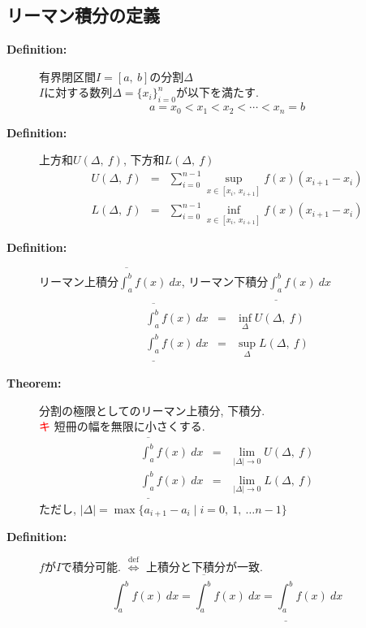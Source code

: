 \documentclass[dvipdfmx]{jsarticle}
\newcommand{\point}{\textcircled{\textcolor{red}{\scriptsize キ}} }
\newcommand{\defEq}{\overset{\mathrm{def}}{\Leftrightarrow}}
\begin{document}
    \subsection{リーマン積分の定義}
    \begin{description}
        \item[\bf{Definition:}] 有界閉区間$I = [a,\ b]$の分割$\Delta$ \\
            $I$に対する数列$\Delta = \{ x_i \}_{i=0}^n$が以下を満たす.
                $$ a = x_0 < x_1 < x_2 < \cdots < x_n = b $$
    
        \item[\bf{Definition:}] 上方和$U(\Delta,\ f)$, 下方和$L(\Delta,\ f)$
            \begin{eqnarray*} 
                U(\Delta,\ f) &=& \sum_{i=0}^{n-1} \sup_{x \in [ x_i,\ x_{i+1} ]} f(x) (x_{i+1} - x_i) \\
                L(\Delta,\ f) &=& \sum_{i=0}^{n-1} \inf_{x \in [ x_i,\ x_{i+1} ]} f(x) (x_{i+1} - x_i)
            \end{eqnarray*}
        
        \item[\bf{Definition:}] リーマン上積分$ \displaystyle \overline {\int_{a}^b} f(x) \ dx $, リーマン下積分$ \displaystyle \underline {\int_{a}^b} f(x) \ dx$
            \begin{eqnarray*} 
                \displaystyle \overline {\int_{a}^b} f(x) \ dx &=& \inf_{\Delta} U(\Delta,\ f) \\
                \displaystyle \underline {\int_{a}^b} f(x) \ dx &=& \sup_{\Delta} L(\Delta,\ f)
            \end{eqnarray*}
        
        \item[\bf{Theorem:}] 分割の極限としてのリーマン上積分, 下積分. \\
            \point 短冊の幅を無限に小さくする.
            \begin{eqnarray*} 
                \displaystyle \overline {\int_{a}^b} f(x) \ dx &=&  \lim_{|\Delta| \to 0} U(\Delta,\ f) \\
                \displaystyle \underline {\int_{a}^b} f(x) \ dx &=& \lim_{|\Delta| \to 0} L(\Delta,\ f)
            \end{eqnarray*}
            ただし, $|\Delta| = \max \{ a_{i+1} - a_i \mid i = 0,\ 1,\ \dots n-1 \}$

        \item[\bf{Definition:}] $f$が$I$で積分可能. $\defEq$ 上積分と下積分が一致. 
            $$ \displaystyle \int_a^b f(x) \ dx = \overline {\int_{a}^b} f(x) \ dx = \underline {\int_{a}^b} f(x) \ dx $$
        

\end{description}
\end{document}
